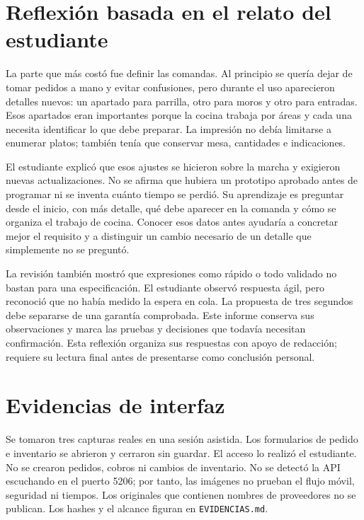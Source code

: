 \documentclass[11pt,a4paper]{article}
\begin{document}
\section{Reflexión basada en el relato del estudiante}
La parte que más costó fue definir las comandas. Al principio se quería dejar de tomar pedidos a mano y evitar confusiones, pero durante el uso aparecieron detalles nuevos: un apartado para parrilla, otro para moros y otro para entradas. Esos apartados eran importantes porque la cocina trabaja por áreas y cada una necesita identificar lo que debe preparar. La impresión no debía limitarse a enumerar platos; también tenía que conservar mesa, cantidades e indicaciones.

El estudiante explicó que esos ajustes se hicieron sobre la marcha y exigieron nuevas actualizaciones. No se afirma que hubiera un prototipo aprobado antes de programar ni se inventa cuánto tiempo se perdió. Su aprendizaje es preguntar desde el inicio, con más detalle, qué debe aparecer en la comanda y cómo se organiza el trabajo de cocina. Conocer esos datos antes ayudaría a concretar mejor el requisito y a distinguir un cambio necesario de un detalle que simplemente no se preguntó.

La revisión también mostró que expresiones como rápido o todo validado no bastan para una especificación. El estudiante observó respuesta ágil, pero reconoció que no había medido la espera en cola. La propuesta de tres segundos debe separarse de una garantía comprobada. Este informe conserva sus observaciones y marca las pruebas y decisiones que todavía necesitan confirmación. Esta reflexión organiza sus respuestas con apoyo de redacción; requiere su lectura final antes de presentarse como conclusión personal.

\section{Evidencias de interfaz}
Se tomaron tres capturas reales en una sesión asistida. Los formularios de pedido e inventario se abrieron y cerraron sin guardar. El acceso lo realizó el estudiante. No se crearon pedidos, cobros ni cambios de inventario. No se detectó la API escuchando en el puerto 5206; por tanto, las imágenes no prueban el flujo móvil, seguridad ni tiempos. Los originales que contienen nombres de proveedores no se publican. Los hashes y el alcance figuran en \texttt{EVIDENCIAS.md}.
\end{document}
